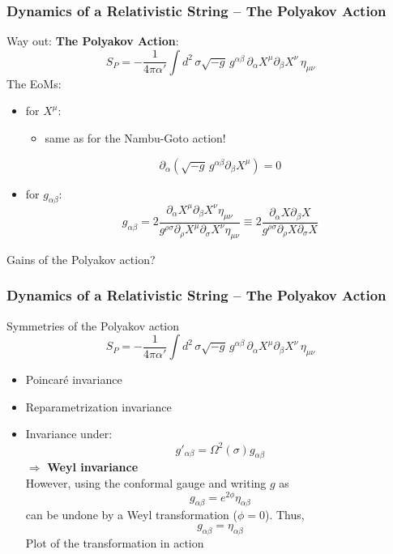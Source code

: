 \documentclass[aspectratio=169]{beamer}
\begin{document}
	\begin{frame}
		\frametitle{Dynamics of a Relativistic String -- The Polyakov Action}
		Way out: \textbf{The Polyakov Action}:
		\begin{equation*}
			S_P = -\frac{1}{4\pi\alpha'}\int d^2 \, \sigma \sqrt{-g} \, g^{\alpha\beta}\,\partial_\alpha X^\mu \partial_\beta X^\nu \, \eta_{\mu\nu}
		\end{equation*}
		The EoMs:
		\begin{itemize}
			\item for $X^\mu$:
			\begin{itemize}
				\item same as for the Nambu-Goto action!
			\end{itemize}
			\begin{equation*}
				\partial_\alpha\left(\sqrt{-g}\,g^{\alpha\beta}\partial_\beta X^{\mu}\right) = 0
			\end{equation*}
			\item for $g_{\alpha\beta}$:
			\begin{equation*}
				g_{\alpha\beta} = 2 \frac{\partial_\alpha X^\mu \partial_\beta X^\nu \eta_{\mu\nu} }{g^{\rho\sigma}\partial_\rho X^\mu \partial_\sigma X^\nu \eta_{\mu\nu}} \equiv 2 \frac{\partial_\alpha X \partial_\beta X}{g^{\rho\sigma}\partial_\rho X \partial_\sigma X}
			\end{equation*}
		\end{itemize}
		Gains of the Polyakov action?
	\end{frame}

	\begin{frame}
		\frametitle{Dynamics of a Relativistic String -- The Polyakov Action}
		Symmetries of the Polyakov action
		\begin{equation*}
			S_P = -\frac{1}{4\pi\alpha'}\int d^2 \, \sigma \sqrt{-g} \, g^{\alpha\beta}\,\partial_\alpha X^\mu \partial_\beta X^\nu \, \eta_{\mu\nu}
		\end{equation*}
		\begin{itemize}
			\item Poincaré invariance
			\item Reparametrization invariance
			\item Invariance under:
			\begin{equation*}
				g'_{\alpha\beta} = \Omega^2(\sigma) g_{\alpha\beta}
			\end{equation*}
			$\Rightarrow$ \textbf{Weyl invariance}\\
			However, using the conformal gauge and writing $g$ as
			\begin{equation*}
				g_{\alpha\beta} = e^{2\phi}\eta_{\alpha\beta}
			\end{equation*}
			can be undone by a Weyl transformation ($\phi=0$). Thus,
			\begin{equation*}
				g_{\alpha\beta} = \eta_{\alpha\beta}
			\end{equation*}
			\color{red} Plot of the transformation in action
		\end{itemize}
	\end{frame}
\end{document}
